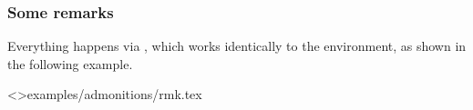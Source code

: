 \documentclass{tutodoc}
\begin{document}

\subsubsection{Some remarks}

Everything happens via , which works identically to the  environment, as shown in the following example.

\tdoclatexinput<>{examples/admonitions/rmk.tex}
\end{document}
